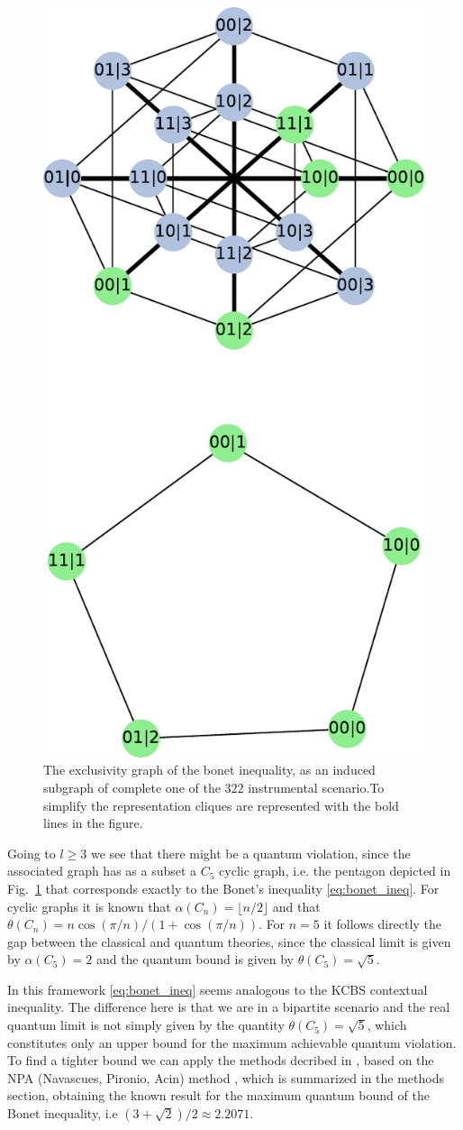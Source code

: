 \documentclass[letterpaper]{article}
\begin{document}
\begin{figure}[h]
    \centering
    \includegraphics[width=.6\columnwidth]{images/instrumental_c5.pdf}
    \caption{The exclusivity graph of the bonet inequality, as an induced
    subgraph of complete one of the $322$ instrumental scenario.To
    simplify the representation cliques are represented with the bold
    lines in the figure.}
    \label{fig:bonetexc}
\end{figure}

Going to $l\ge3$ we see that there might be a quantum violation, since the associated
graph has as a subset a $C_5$ cyclic graph, i.e. the pentagon depicted in
Fig.~\ref{fig:bonetexc} that corresponds exactly to the Bonet's inequality \eqref{eq:bonet_ineq}.
For cyclic graphs it is known that $\alpha(C_n) = \lfloor n/2 \rfloor$ and that
$\theta(C_n) = n\cos(\pi/n)/(1+\cos(\pi/n))$. For $n=5$ it follows directly the
gap between the classical and quantum theories, since the classical limit is
given by $\alpha(C_5)=2$ and the quantum bound is given by $\theta(C_5)=\sqrt{5}$.

In this framework \eqref{eq:bonet_ineq} seems analogous to the KCBS contextual
inequality\cite{kcbs2008}.
The difference here is that we are in a bipartite scenario and the real quantum
limit is not simply given by the quantity $\theta(C_5) = \sqrt{5}$, which
constitutes only an upper bound for the maximum achievable quantum violation.
To find a tighter bound we can apply the methods decribed in
\cite{rabelo2014}, based on the NPA (Navascues, Pironio, Acin) method
\cite{npa2008}, which is summarized in the methods section, obtaining the known
result for the maximum quantum bound of the Bonet inequality, i.e
$(3+\sqrt{2})/2 \approx 2.2071$.
\end{document}
